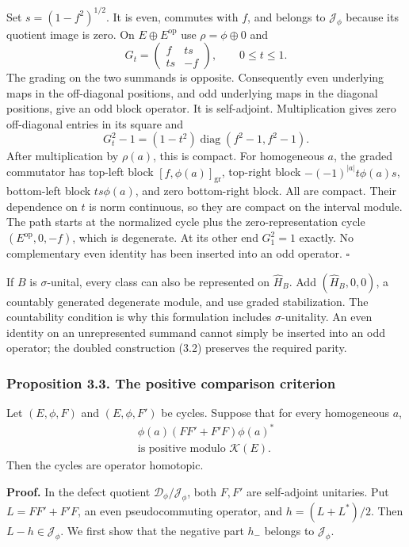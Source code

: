 \documentclass[
  11pt,
]{article}
\begin{document}
Set \(s=(1-f^2)^{1/2}\). It is even, commutes with \(f\), and belongs to
\(\mathcal J_\phi\) because its quotient image is zero. On
\(E\oplus E^{\mathrm{op}}\) use \(\rho=\phi\oplus0\) and \[
G_t=\begin{pmatrix}f&ts\\ts&-f\end{pmatrix},
\qquad 0\leq t\leq1.
\tag{3.2}
\] The grading on the two summands is opposite. Consequently even
underlying maps in the off-diagonal positions, and odd underlying maps
in the diagonal positions, give an odd block operator. It is
self-adjoint. Multiplication gives zero off-diagonal entries in its
square and \[
G_t^2-1=(1-t^2)\operatorname{diag}(f^2-1,f^2-1).
\] After multiplication by \(\rho(a)\), this is compact. For homogeneous
\(a\), the graded commutator has top-left block
\([f,\phi(a)]_{\mathrm{gr}}\), top-right block \(-(-1)^{|a|}t\phi(a)s\),
bottom-left block \(ts\phi(a)\), and zero bottom-right block. All are
compact. Their dependence on \(t\) is norm continuous, so they are
compact on the interval module. The path starts at the normalized cycle
plus the zero-representation cycle \((E^{\mathrm{op}},0,-f)\), which is
degenerate. At its other end \(G_1^2=1\) exactly. No complementary even
identity has been inserted into an odd operator. \(\square\)

If \(B\) is \(\sigma\)-unital, every class can also be represented on
\(\widehat H_B\). Add \((\widehat H_B,0,0)\), a countably generated
degenerate module, and use graded stabilization. The countability
condition is why this formulation includes \(\sigma\)-unitality. An even
identity on an unrepresented summand cannot simply be inserted into an
odd operator; the doubled construction (3.2) preserves the required
parity.

\subsubsection{Proposition 3.3. The positive comparison
criterion}\label{proposition-3.3.-the-positive-comparison-criterion}

Let \((E,\phi,F)\) and \((E,\phi,F')\) be cycles. Suppose that for every
homogeneous \(a\), \[
\begin{gathered}
\phi(a)(FF'+F'F)\phi(a)^*
\\
\text{is positive modulo }\mathcal K(E).
\end{gathered}
\tag{3.3}
\] Then the cycles are operator homotopic.

\textbf{Proof.} In the defect quotient
\(\mathcal D_\phi/\mathcal J_\phi\), both \(F,F'\) are self-adjoint
unitaries. Put \(L=FF'+F'F\), an even pseudocommuting operator, and
\(h=(L+L^*)/2\). Then \(L-h\in\mathcal J_\phi\). We first show that the
negative part \(h_-\) belongs to \(\mathcal J_\phi\).
\end{document}

